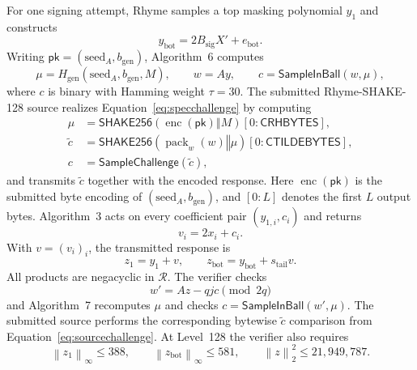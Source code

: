 \documentclass[11pt,a4paper]{article}
\newcommand{\R}{\mathcal{R}}
\newcommand{\SampleChallenge}{\mathsf{SampleChallenge}}
\newcommand{\SampleInBall}{\mathsf{SampleInBall}}
\newcommand{\SHAKE}{\mathsf{SHAKE256}}
\newcommand{\pk}{\mathsf{pk}}
\newcommand{\norm}[1]{\left\lVert #1\right\rVert}
\newcommand{\infnorm}[1]{\left\lVert #1\right\rVert_{\infty}}
\begin{document}
For one signing attempt, Rhyme samples a top masking polynomial $y_1$ and
constructs
\begin{equation}
             y_{\mathrm{bot}}=2B_{\mathrm{sig}}X'+e_{\mathrm{bot}}.
                                                               \label{eq:ybot}
\end{equation}
Writing $\pk=(\mathrm{seed}_A,b_{\mathrm{gen}})$, Algorithm~6 computes
\begin{equation}
 \mu=H_{\mathrm{gen}}(\mathrm{seed}_A,b_{\mathrm{gen}},M),\qquad
 w=Ay,\qquad c=\SampleInBall(w,\mu),                 \label{eq:specchallenge}
\end{equation}
where $c$ is binary with Hamming weight $\tau=30$.  The submitted
Rhyme-SHAKE-128 source realizes Equation~\eqref{eq:specchallenge} by computing
\begin{align}
 \mu&=\SHAKE(\operatorname{enc}(\pk)\mathbin\Vert M)
                 [0\mathbin{:}\mathsf{CRHBYTES}],\nonumber\\
 \widetilde c&=\SHAKE(\operatorname{pack}_w(w)\mathbin\Vert\mu)
                 [0\mathbin{:}\mathsf{CTILDEBYTES}],\nonumber\\
 c&=\SampleChallenge(\widetilde c),                  \label{eq:sourcechallenge}
\end{align}
and transmits $\widetilde c$ together with the encoded response.  Here
$\operatorname{enc}(\pk)$ is the submitted byte encoding of
$(\mathrm{seed}_A,b_{\mathrm{gen}})$, and $[0\mathbin{:}L]$ denotes the first
$L$ output bytes.  Algorithm~3 acts on every coefficient pair
$(y_{1,i},c_i)$ and returns
\[
                           v_i=2x_i+c_i.
\]
With $v=(v_i)_i$, the transmitted response is
\begin{equation}
 z_1=y_1+v,\qquad
 z_{\mathrm{bot}}=y_{\mathrm{bot}}+s_{\mathrm{tail}}v.
                                                               \label{eq:response}
\end{equation}
All products are negacyclic in $\R$.  The verifier checks
\begin{equation}
                         w'=Az-qjc\pmod {2q}            \label{eq:verify}
\end{equation}
and Algorithm~7 recomputes $\mu$ and checks
$c=\SampleInBall(w',\mu)$.  The submitted source performs the corresponding
bytewise $\widetilde c$ comparison from Equation~\eqref{eq:sourcechallenge}.
At Level~128 the verifier also requires
\begin{equation}
 \infnorm{z_1}\le388,\qquad
 \infnorm{z_{\mathrm{bot}}}\le581,\qquad
 \norm{z}_2^2\le21{,}949{,}787.                       \label{eq:bounds}
\end{equation}
\end{document}
